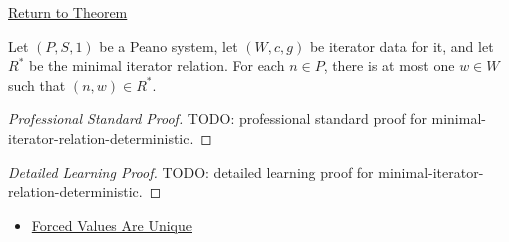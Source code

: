\newpage
{}
\label{prf:minimal-iterator-relation-deterministic}

\begin{remark*}[Return]
\hyperref[lem:minimal-iterator-relation-deterministic]{Return to Theorem}
\end{remark*}

\begin{lemma*}
Let $(P,S,1)$ be a Peano system, let $(W,c,g)$ be iterator data for it, and let
$R^*$ be the minimal iterator relation. For each $n\in P$, there is at most one
$w\in W$ such that $(n,w)\in R^*$.
\end{lemma*}

\begin{proof}[Professional Standard Proof]
\LRAProofBodyStart
TODO: professional standard proof for minimal-iterator-relation-deterministic.
\end{proof}

\begin{proof}[Detailed Learning Proof]
\LRAProofBodyStart
TODO: detailed learning proof for minimal-iterator-relation-deterministic.
\end{proof}

\begin{remark*}
\end{remark*}

\begin{dependencies}
\begin{itemize}
  \item \hyperref[lem:forced-values-are-unique]{Forced Values Are Unique}
\end{itemize}
\end{dependencies}

\clearpage
